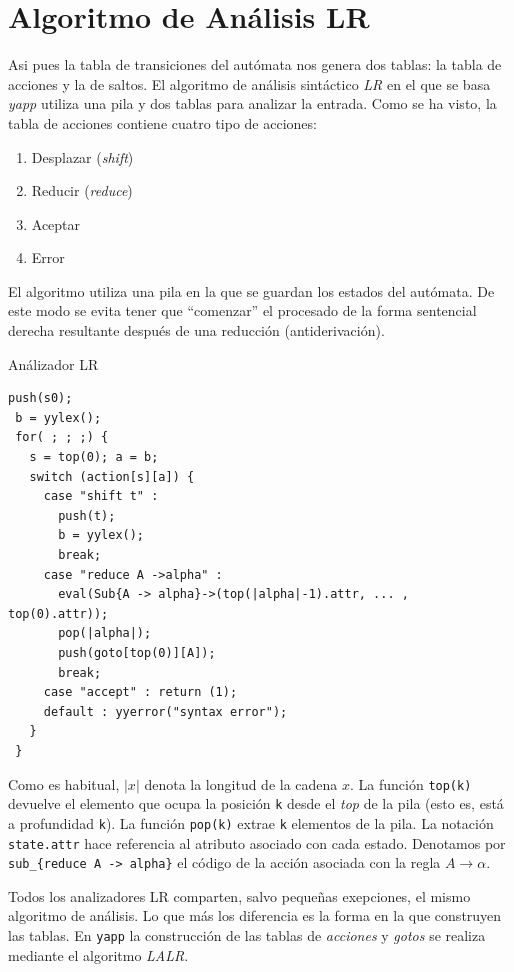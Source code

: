 \section{Algoritmo de Análisis LR}
\label{section:algoritmoLR}
Asi  pues la tabla de transiciones del autómata nos genera dos tablas:
la tabla de acciones y la de saltos.
El  algoritmo  de análisis sintáctico \emph{LR} en el  que 
se basa \emph{yapp} utiliza una pila y dos tablas 
para analizar la entrada. %
Como se ha visto, la tabla  de acciones contiene cuatro tipo de acciones: 
\begin{enumerate}
\item
Desplazar (\emph{shift})
\item
Reducir (\emph{reduce})
\item
Aceptar
\item
Error
\end{enumerate}
El algoritmo utiliza una pila en la que se guardan los estados
del autómata. De este modo se evita tener que ``comenzar'' 
el procesado de la forma sentencial derecha resultante
después de una reducción (antiderivación).
\begin{algorithm}
\label{alg:parser}       
Análizador LR
\begin{verbatim}
push(s0);
 b = yylex();
 for( ; ; ;) {
   s = top(0); a = b;
   switch (action[s][a]) {
     case "shift t" : 
       push(t); 
       b = yylex();
       break;
     case "reduce A ->alpha" : 
       eval(Sub{A -> alpha}->(top(|alpha|-1).attr, ... , top(0).attr)); 
       pop(|alpha|); 
       push(goto[top(0)][A]); 
       break;
     case "accept" : return (1); 
     default : yyerror("syntax error");
   }
 }
\end{verbatim}
\end{algorithm}
Como es habitual, $|x|$ denota la longitud de la cadena $x$.
La función \verb|top(k)| devuelve el elemento que ocupa la 
posición \verb|k| desde el \emph{top} de la pila (esto es, está a profundidad \verb|k|).
La función \verb|pop(k)| extrae \verb|k| elementos de la pila.
La notación \verb|state.attr| hace referencia al atributo
asociado con cada estado. Denotamos por \verb|sub_{reduce A -> alpha}|
el código de la acción asociada con la regla $A \rightarrow \alpha$.
%

Todos los analizadores LR comparten, salvo pequeñas
exepciones, el mismo algoritmo
de análisis. Lo que más los diferencia es la forma en 
la que construyen las tablas.
En \verb|yapp|
la construcción de las tablas de \emph{acciones} y \emph{gotos}
se realiza mediante el algoritmo \emph{LALR}.

